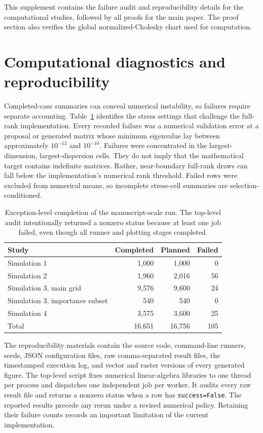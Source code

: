 \documentclass[
  12pt]{article}
\begin{document}
\noindent
This supplement contains the failure audit and reproducibility details for the computational studies, followed by all proofs for the main paper. The proof section also verifies the global normalized-Cholesky chart used for computation.

\section{Computational diagnostics and reproducibility}\label{sec:supp_failures}

Completed-case summaries can conceal numerical instability, so failures require separate accounting. Table~\ref{tab:completion} identifies the stress settings that challenge the full-rank implementation. Every recorded failure was a numerical validation error at a proposal or generated matrix whose minimum eigenvalue lay between approximately $10^{-13}$ and $10^{-10}$. Failures were concentrated in the largest-dimension, largest-dispersion cells. They do not imply that the mathematical target contains indefinite matrices. Rather, near-boundary full-rank draws can fall below the implementation's numerical rank threshold. Failed rows were excluded from numerical means, so incomplete stress-cell summaries are selection-conditioned.

\begin{table}[H]
\centering
\caption{Exception-level completion of the manuscript-scale run. The top-level audit intentionally returned a nonzero status because at least one job failed, even though all runner and plotting stages completed.}
\label{tab:completion}
\begin{tabular}{lrrr}
\toprule
Study & Completed & Planned & Failed \\
\midrule
Simulation 1 & 1,000 & 1,000 & 0 \\
Simulation 2 & 1,960 & 2,016 & 56 \\
Simulation 3, main grid & 9,576 & 9,600 & 24 \\
Simulation 3, importance subset & 540 & 540 & 0 \\
Simulation 4 & 3,575 & 3,600 & 25 \\
\midrule
Total & 16,651 & 16,756 & 105 \\
\bottomrule
\end{tabular}
\end{table}

The reproducibility materials contain the source code, command-line runners, seeds, JSON configuration files, raw comma-separated result files, the timestamped execution log, and vector and raster versions of every generated figure. The top-level script fixes numerical linear-algebra libraries to one thread per process and dispatches one independent job per worker. It audits every raw result file and returns a nonzero status when a row has \texttt{success=False}. The reported results precede any rerun under a revised numerical policy. Retaining their failure counts records an important limitation of the current implementation.
\end{document}
